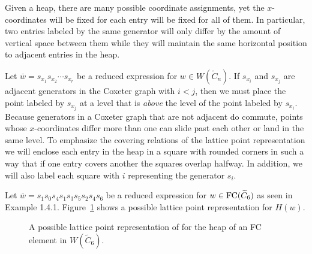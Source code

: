 Given a heap, there are many possible coordinate assignments, yet the $x$-coordinates will be fixed for each entry will be fixed for all of them. In particular, two entries labeled by the same generator will only differ by the amount of vertical space between them while they will maintain the same horizontal position to adjacent entries in the heap.

Let $\overline{w}=s_{x_1}s_{x_2}\cdots s_{x_r}$ be a reduced expression for $w \in W(\widetilde{C}_n)$. If $s_{x_i}$ and $s_{x_j}$ are adjacent generators in the Coxeter graph with $i<j$, then we must place the point labeled by $s_{x_j}$ at a level that is \emph{above} the level of the point labeled by $s_{x_i}$. Because generators in a Coxeter graph that are not adjacent do commute, points whose $x$-coordinates differ more than one can slide past each other or land in the same level. To emphasize the covering relations of the lattice point representation we will enclose each entry in the heap in a square with rounded corners in such a way that if one entry covers another the squares overlap halfway. In addition, we will also label each square with $i$ representing the generator $s_i$.

\begin{example}
	Let $\overline{w}=s_1s_0s_4s_1s_3s_5s_2s_4s_6$ be a reduced expression for $w \in \mathrm{FC}(\widetilde{C}_6)$ as seen in Example 1.4.1. Figure~\ref{fig:FC heap} shows a possible lattice point representation for $H(w)$.
\begin{figure}[h]
\centering
{}
\caption{A possible lattice point representation of for the heap of an FC element in $W(\widetilde{C}_6)$.}
\label{fig:FC heap}
\end{figure}
\end{example}

